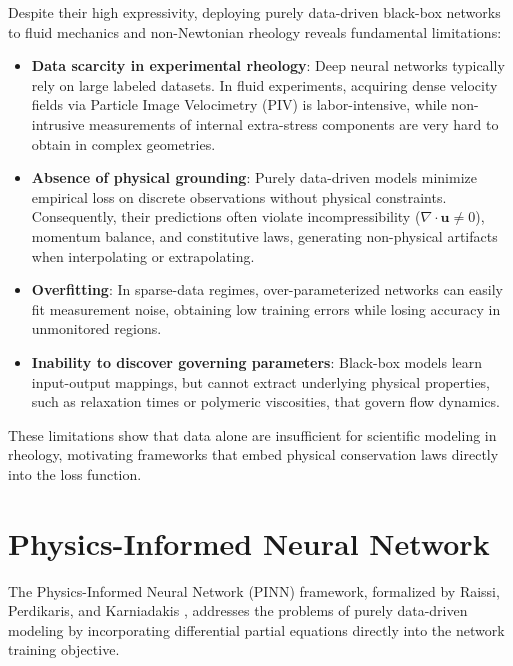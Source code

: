 Despite their high expressivity, deploying purely data-driven black-box networks
to fluid mechanics and non-Newtonian rheology reveals fundamental limitations:
\begin{itemize}
    \item \textbf{Data scarcity in experimental rheology}:
    Deep neural networks typically rely on large labeled datasets.
    In fluid experiments, acquiring dense velocity fields via Particle Image Velocimetry (PIV) is labor-intensive,
    while non-intrusive measurements of internal extra-stress components are very hard to obtain in complex geometries.
    \item \textbf{Absence of physical grounding}:
    Purely data-driven models minimize empirical loss on discrete observations without physical constraints.
    Consequently, their predictions often violate incompressibility ($\nabla \cdot \boldsymbol{u} \neq 0$),
    momentum balance, and constitutive laws, generating non-physical artifacts when interpolating or extrapolating.
    \item \textbf{Overfitting}:
    In sparse-data regimes, over-parameterized networks can easily fit measurement noise,
    obtaining low training errors while losing accuracy in unmonitored regions.
    \item \textbf{Inability to discover governing parameters}:
    Black-box models learn input-output mappings,
    but cannot extract underlying physical properties, such as relaxation times or polymeric viscosities, that govern flow dynamics.
\end{itemize}

These limitations show that data alone are insufficient for scientific modeling in rheology,
motivating frameworks that embed physical conservation laws directly into the loss function.

\section{Physics-Informed Neural Network}
\label{sec:pinn_paradigm}

The Physics-Informed Neural Network (PINN) framework, formalized by Raissi, Perdikaris, and Karniadakis \cite{raissi2019physics},
addresses the problems of purely data-driven modeling
by incorporating differential partial equations directly into the network training objective.

